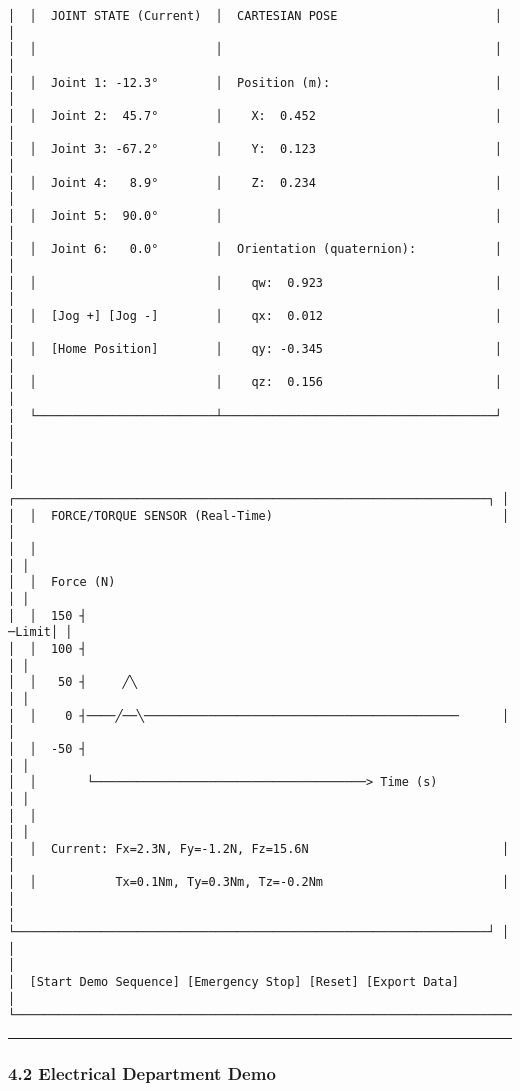 \documentclass[
]{article}
\begin{document}
\begin{verbatim}
│  │  JOINT STATE (Current)  │  CARTESIAN POSE                      │   │
│  │                         │                                      │   │
│  │  Joint 1: -12.3°        │  Position (m):                       │   │
│  │  Joint 2:  45.7°        │    X:  0.452                         │   │
│  │  Joint 3: -67.2°        │    Y:  0.123                         │   │
│  │  Joint 4:   8.9°        │    Z:  0.234                         │   │
│  │  Joint 5:  90.0°        │                                      │   │
│  │  Joint 6:   0.0°        │  Orientation (quaternion):           │   │
│  │                         │    qw:  0.923                        │   │
│  │  [Jog +] [Jog -]        │    qx:  0.012                        │   │
│  │  [Home Position]        │    qy: -0.345                        │   │
│  │                         │    qz:  0.156                        │   │
│  └─────────────────────────┴──────────────────────────────────────┘   │
│                                                                        │
│  ┌──────────────────────────────────────────────────────────────────┐ │
│  │  FORCE/TORQUE SENSOR (Real-Time)                                │ │
│  │                                                                   │ │
│  │  Force (N)                                                       │ │
│  │  150 ┤                                                     ─Limit│ │
│  │  100 ┤                                                           │ │
│  │   50 ┤     ╱╲                                                    │ │
│  │    0 ┤────╱──╲────────────────────────────────────────────      │ │
│  │  -50 ┤                                                           │ │
│  │       └──────────────────────────────────────> Time (s)          │ │
│  │                                                                   │ │
│  │  Current: Fx=2.3N, Fy=-1.2N, Fz=15.6N                           │ │
│  │           Tx=0.1Nm, Ty=0.3Nm, Tz=-0.2Nm                         │ │
│  └──────────────────────────────────────────────────────────────────┘ │
│                                                                        │
│  [Start Demo Sequence] [Emergency Stop] [Reset] [Export Data]         │
└────────────────────────────────────────────────────────────────────────┘
\end{verbatim}

\begin{center}\rule{0.5\linewidth}{0.5pt}\end{center}

\hypertarget{electrical-department-demo}{%
\subsubsection{4.2 Electrical Department
Demo}\label{electrical-department-demo}}
\end{document}
